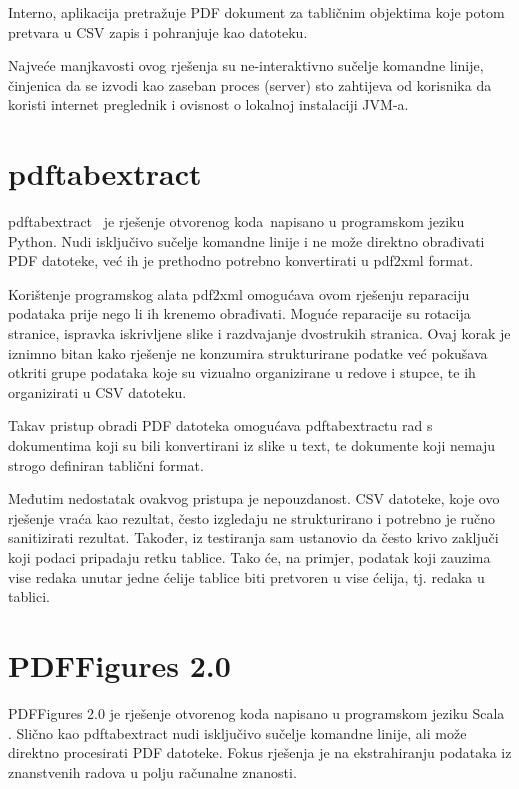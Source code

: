 \documentclass[times, utf8, zavrsni]{fer}
\begin{document}
Interno, aplikacija pretražuje PDF dokument za tabličnim objektima koje potom
pretvara u CSV zapis i pohranjuje kao datoteku.

Najveće manjkavosti ovog rješenja su ne-interaktivno sučelje komandne linije,
činjenica da se izvodi kao zaseban proces (server) sto zahtijeva od korisnika
da koristi internet preglednik i ovisnost o lokalnoj instalaciji JVM-a.

\section{pdftabextract}

pdftabextract \cite{pdftabextract_repository} je rješenje otvorenog koda napisano
u programskom jeziku Python.
Nudi isključivo sučelje komandne linije i ne može direktno obrađivati PDF
datoteke, već ih je prethodno potrebno konvertirati u pdf2xml format.

Korištenje programskog alata pdf2xml omogućava ovom rješenju reparaciju
podataka prije nego li ih krenemo obrađivati. Moguće reparacije su rotacija
stranice, ispravka iskrivljene slike i razdvajanje dvostrukih stranica. Ovaj
korak je iznimno bitan kako rješenje ne konzumira strukturirane podatke već
pokušava otkriti grupe podataka koje su vizualno organizirane u redove i
stupce, te ih organizirati u CSV datoteku.

Takav pristup obradi PDF datoteka omogućava pdftabextractu rad s dokumentima
koji su bili konvertirani iz slike u text, te dokumente koji nemaju strogo
definiran tablični format.

Međutim nedostatak ovakvog pristupa je nepouzdanost.
CSV datoteke, koje ovo rješenje vraća kao rezultat, često izgledaju ne
strukturirano i potrebno je ručno sanitizirati rezultat. Također, iz testiranja
sam ustanovio da često krivo zaključi koji podaci pripadaju retku tablice.
Tako će, na primjer, podatak koji zauzima vise redaka unutar jedne ćelije
tablice biti pretvoren u vise ćelija, tj. redaka u tablici.

\section{PDFFigures 2.0}

PDFFigures 2.0 \cite{pdffigures_2_repository} je rješenje otvorenog koda
napisano u programskom jeziku Scala \cite{scala_documentation}. Slično kao
pdftabextract nudi isključivo
sučelje komandne linije, ali može direktno procesirati PDF datoteke. Fokus
rješenja je na ekstrahiranju podataka iz znanstvenih radova u polju računalne
znanosti.
\end{document}
